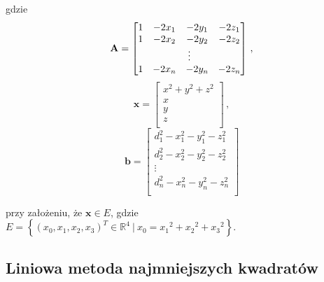gdzie
\begin{equation}
    \mathbf{A} =
    \left[
        \begin{matrix}
            1 & -2x_1 & -2y_1 & -2z_1  \\
            1 & -2x_2 & -2y_2 & -2z_2  \\
            \multicolumn{4}{c}{\vdots} \\
            1 & -2x_n & -2y_n & -2z_n  \\
        \end{matrix}
        \right]\,,
\end{equation}
\begin{equation}
    \mathbf{x} =
    \left[
        \begin{matrix}
            x^2 + y^2 + z^2 \\
            x               \\
            y               \\
            z               \\
        \end{matrix}
        \right]\,,
\end{equation}
\begin{equation}
    \mathbf{b} =
    \left[
        \begin{matrix}
            d_1^2 - x_1^2 - y_1^2 - z_1^2 \\
            d_2^2 - x_2^2 - y_2^2 - z_2^2 \\
            \vdots                        \\
            d_n^2 - x_n^2 - y_n^2 - z_n^2 \\
        \end{matrix}
        \right]
\end{equation}

przy założeniu, że $\mathbf{x} \in E$, gdzie $E = \left\{(x_0, x_1, x_2, x_3)^T \in {\mathbb{R}}^4\ |\ x_0 = {x_1}^2 + {x_2}^2 + {x_3}^2\right\}$.

\subsection{Liniowa metoda najmniejszych kwadratów}

